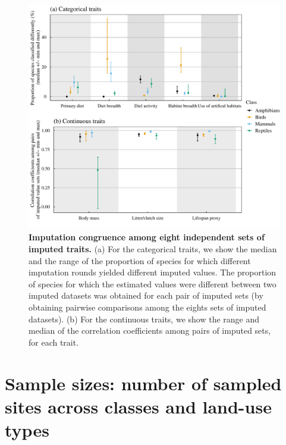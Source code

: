 \documentclass[11pt]{article}
\begin{document}
\begin{figure}[h!]
\centering
\includegraphics[scale=0.7]{Figures/Imputation_congruence}
\caption[]{\textbf{Imputation congruence among eight independent sets of imputed traits.} (a) For the categorical traits, we show the median and the range of the proportion of species for which different imputation rounds yielded different imputed values. The proportion of species for which the estimated values were different between two imputed datasets was obtained for each pair of imputed sets (by obtaining pairwise comparisons among the eights sets of imputed datasets). (b) For the continuous traits, we show the range and median of the correlation coefficients among pairs of imputed sets, for each trait.}
\label{}
\end{figure}


\clearpage

\section{Sample sizes: number of sampled sites across classes and land-use types}
\end{document}
